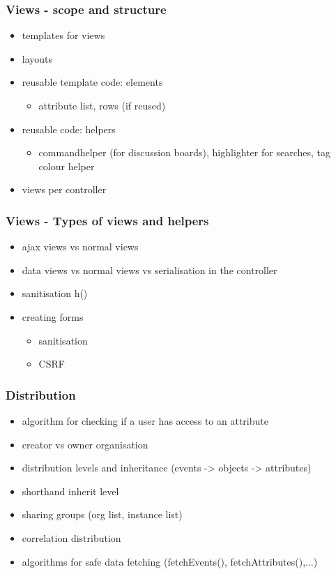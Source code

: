 \begin{frame}
  \frametitle{Views - scope and structure}
  \begin{itemize}
    \item templates for views
    \item layouts
    \item reusable template code: elements
    \begin{itemize}
      \item attribute list, rows (if reused)
    \end{itemize}
    \item reusable code: helpers
    \begin{itemize}
      \item commandhelper (for discussion boards), highlighter for searches, tag colour helper
    \end{itemize}
    \item views per controller
  \end{itemize}
\end{frame}

\begin{frame}
  \frametitle{Views - Types of views and helpers}
  \begin{itemize}
    \item ajax views vs normal views
    \item data views vs normal views vs serialisation in the controller
    \item sanitisation h()
    \item creating forms
    \begin{itemize}
      \item sanitisation
      \item CSRF
    \end{itemize}
  \end{itemize}
\end{frame}

\begin{frame}
  \frametitle{Distribution}
  \begin{itemize}
    \item algorithm for checking if a user has access to an attribute
    \item creator vs owner organisation
    \item distribution levels and inheritance (events -> objects -> attributes)
    \item shorthand inherit level
    \item sharing groups (org list, instance list)
    \item correlation distribution
    \item algorithms for safe data fetching (fetchEvents(), fetchAttributes(),...)
  \end{itemize}
\end{frame}

